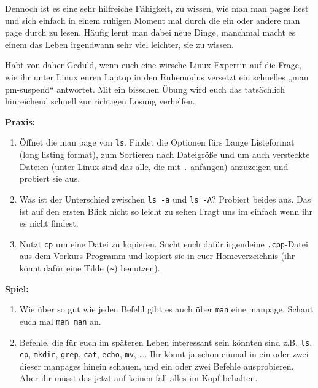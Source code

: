 Dennoch ist es eine sehr hilfreiche Fähigkeit, zu wissen, wie man man pages
liest und sich einfach in einem ruhigen Moment mal durch die ein oder andere
man page durch zu lesen. Häufig lernt man dabei neue Dinge, manchmal macht es
einem das Leben irgendwann sehr viel leichter, sie zu wissen.

Habt von daher Geduld, wenn euch eine wirsche Linux-Expertin auf die Frage, wie
ihr unter Linux euren Laptop in den Ruhemodus versetzt ein schnelles „man
pm-suspend“ antwortet. Mit ein bisschen Übung wird euch das tatsächlich
hinreichend schnell zur richtigen Lösung verhelfen.

\textbf{Praxis:}
\begin{enumerate}[resume]
    \item Öffnet die man page von \texttt{ls}. Findet die Optionen fürs Lange
				Listeformat (long listing format), zum Sortieren nach Dateigröße
				und um auch versteckte Dateien (unter Linux sind das alle, die mit
				\texttt{.} anfangen) anzuzeigen und probiert sie aus.
    \item Was ist der Unterschied zwischen \texttt{ls -a} und \texttt{ls -A}?
        Probiert beides aus. Das ist auf den ersten Blick nicht so leicht zu sehen
				Fragt uns im einfach wenn ihr es nicht findest.
    \item Nutzt \texttt{cp} um eine Datei zu kopieren. Sucht euch dafür
        irgendeine \texttt{.cpp}-Datei aus dem Vorkurs-Programm und kopiert sie
        in euer Homeverzeichnis (ihr könnt dafür eine Tilde (\texttt{\~})
        benutzen).
\end{enumerate}

\textbf{Spiel:}
\begin{enumerate}
    \item Wie über so gut wie jeden Befehl gibt es auch über \texttt{man} eine
        manpage. Schaut euch mal \texttt{man man} an.
    \item Befehle, die für euch im späteren Leben interessant sein könnten sind
        z.B. \texttt{ls}, \texttt{cp}, \texttt{mkdir}, \texttt{grep}, \texttt{cat},
        \texttt{echo}, \texttt{mv}, \dots. Ihr könnt ja schon einmal in ein
        oder zwei dieser manpages hinein schauen, und ein oder zwei Befehle
        ausprobieren. Aber ihr müsst das jetzt auf keinen fall alles im Kopf
				behalten.
\end{enumerate}

